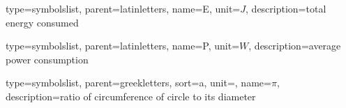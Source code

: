 

%
%


{
	type=symbolslist,
	parent=latinletters,
	name={E},
	unit={\ensuremath{J}},
	description={total energy consumed}
}

{
	type=symbolslist,
	parent=latinletters,
	name={P},
	unit={\ensuremath{W}},
	description={average power consumption}
}


{
	type=symbolslist,
	parent=greekletters,
	sort=a,
	unit={},
	name={\ensuremath{\pi}},
	description={ratio of circumference of circle to its diameter}
}




 
